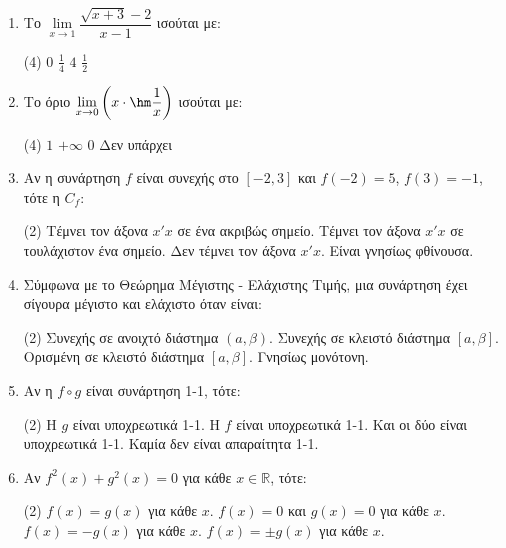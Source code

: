 \begin{enumerate}[label=\textbf{1.\arabic*.}, itemsep=4mm]
    \item Το $\lim\limits_{x \to 1} \dfrac{\sqrt{x+3} - 2}{x-1}$ ισούται με:
    \begin{tasks}[label=\let\textdexiakeraia\relax\alph*.](4)
        \task $0$
        \task $\frac{1}{4}$
        \task $4$
        \task $\frac{1}{2}$
    \end{tasks}

    \item Το όριο $\lim\limits_{x \to 0} \left( x \cdot \hm \dfrac{1}{x} \right)$ ισούται με:
    \begin{tasks}[label=\let\textdexiakeraia\relax\alph*.](4)
        \task $1$
        \task $+\infty$
        \task $0$
        \task Δεν υπάρχει
    \end{tasks}

    \item Αν η συνάρτηση $f$ είναι συνεχής στο $[-2, 3]$ και $f(-2)=5$, $f(3)=-1$, τότε η $C_f$:
    \begin{tasks}[label=\let\textdexiakeraia\relax\alph*.](2)
        \task Τέμνει τον άξονα $x'x$ σε ένα ακριβώς σημείο.
        \task Τέμνει τον άξονα $x'x$ σε τουλάχιστον ένα σημείο.
        \task Δεν τέμνει τον άξονα $x'x$.
        \task Είναι γνησίως φθίνουσα.
    \end{tasks}

    \item Σύμφωνα με το Θεώρημα Μέγιστης - Ελάχιστης Τιμής, μια συνάρτηση έχει σίγουρα μέγιστο και ελάχιστο όταν είναι:
    \begin{tasks}[label=\let\textdexiakeraia\relax\alph*.](2)
        \task Συνεχής σε ανοιχτό διάστημα $(a, \beta)$.
        \task Συνεχής σε κλειστό διάστημα $[a, \beta]$.
        \task Ορισμένη σε κλειστό διάστημα $[a, \beta]$.
        \task Γνησίως μονότονη.
    \end{tasks}

    \item Αν η $f \circ g$ είναι συνάρτηση 1-1, τότε:
    \begin{tasks}[label=\let\textdexiakeraia\relax\alph*.](2)
        \task Η $g$ είναι υποχρεωτικά 1-1.
        \task Η $f$ είναι υποχρεωτικά 1-1.
        \task Και οι δύο είναι υποχρεωτικά 1-1.
        \task Καμία δεν είναι απαραίτητα 1-1.
    \end{tasks}

    \item Αν $f^2(x) + g^2(x) = 0$ για κάθε $x \in \mathbb{R}$, τότε:
    \begin{tasks}[label=\let\textdexiakeraia\relax\alph*.](2)
        \task $f(x) = g(x)$ για κάθε $x$.
        \task $f(x) = 0$ και $g(x) = 0$ για κάθε $x$.
        \task $f(x) = -g(x)$ για κάθε $x$.
        \task $f(x) = \pm g(x)$ για κάθε $x$.
    \end{tasks}


\end{enumerate}
